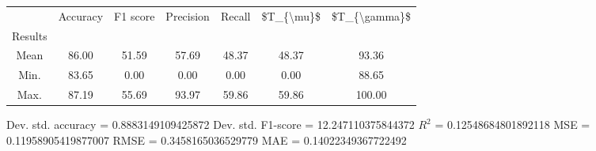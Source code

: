 \begin{tabular}{|c|c|c|c|c|c|c|}
\toprule
{} &  Accuracy &  F1 score &  Precision &  Recall &  \$T\_\{\textbackslash mu\}\$ &  \$T\_\{\textbackslash gamma\}\$ \\
Results &           &           &            &         &            &               \\
\hline
Mean    &     86.00 &     51.59 &      57.69 &   48.37 &      48.37 &         93.36 \\
Min.    &     83.65 &      0.00 &       0.00 &    0.00 &       0.00 &         88.65 \\
Max.    &     87.19 &     55.69 &      93.97 &   59.86 &      59.86 &        100.00 \\
\bottomrule
\end{tabular}

 Dev. std. accuracy = 0.8883149109425872
 Dev. std. F1-score = 12.247110375844372
 $R^2$ = 0.12548684801892118
 MSE = 0.11958905419877007
 RMSE = 0.3458165036529779
 MAE = 0.14022349367722492